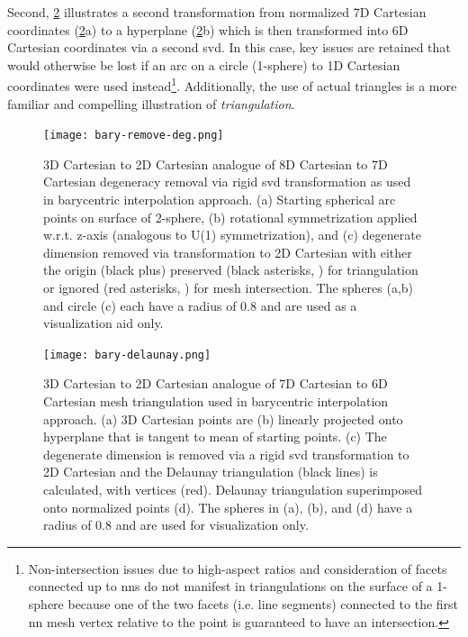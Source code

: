 \documentclass[final,12pt]{elsarticle}
\begin{document}
Second, \cref{fig:bary-delaunay} illustrates a second transformation from normalized 7D Cartesian coordinates (\cref{fig:bary-delaunay}a) to a hyperplane (\cref{fig:bary-delaunay}b) which is then transformed into 6D Cartesian coordinates via a second \gls{svd}. In this case, key issues are retained that would otherwise be lost if an arc on a circle (1-sphere) to 1D Cartesian coordinates were used instead\footnote{Non-intersection issues due to high-aspect ratios and consideration of facets connected up to  \glspl{nn} do not manifest in triangulations on the surface of a 1-sphere because one of the two facets (i.e. line segments) connected to the first \gls{nn} mesh vertex relative to the \outpt{} point is guaranteed to have an intersection.}. Additionally, the use of actual triangles is a more familiar and compelling illustration of \textit{triangulation}.

\begin{figure}
	\centering
	\texttt{[image: bary-remove-deg.png]}
	\caption{3D Cartesian to 2D Cartesian analogue of 8D Cartesian to 7D Cartesian degeneracy removal via rigid \gls{svd} transformation as used in barycentric interpolation approach. (a) Starting spherical arc points on surface of 2-sphere, (b) rotational symmetrization applied w.r.t. z-axis (analogous to U(1) symmetrization), and (c) degenerate dimension removed via  transformation to 2D Cartesian with either the origin (black plus) preserved (black asterisks, ) for triangulation or ignored (red asterisks, ) for mesh intersection. The spheres (a,b) and circle (c) each have a radius of 0.8 and are used as a visualization aid only.}
	\label{fig:bary-remove-deg}
\end{figure}

\begin{figure}
	\centering
	\texttt{[image: bary-delaunay.png]}
	\caption{3D Cartesian to 2D Cartesian analogue of 7D Cartesian to 6D Cartesian mesh triangulation used in barycentric interpolation approach. (a) 3D Cartesian \inpt{} points are (b) linearly projected onto hyperplane that is tangent to mean of starting points. (c) The degenerate dimension is removed via a rigid \gls{svd} transformation to 2D Cartesian and the Delaunay triangulation (black lines) is calculated, with \inpt{} vertices (red). Delaunay triangulation superimposed onto normalized \inpt{} points (d). The spheres in (a), (b), and (d) have a radius of 0.8 and are used for visualization only.}
	\label{fig:bary-delaunay}
\end{figure}
\end{document}
